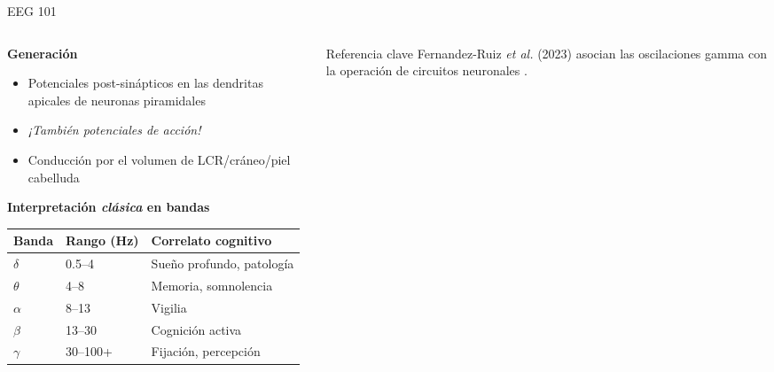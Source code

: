 \begin{frame}{EEG 101}
  \begin{columns}[T]
    \begin{column}{0.50\textwidth}
      \textbf{Generación}
      \begin{itemize}
        \item Potenciales post-sinápticos en las dendritas apicales de neuronas piramidales
        \item \emph{¡También potenciales de acción!}
        \item Conducción por el volumen de LCR/cráneo/piel cabelluda
      \end{itemize}
      \vspace{0.8em}
      \textbf{Interpretación \emph{clásica} en bandas}
        \small
        \begin{tabular}{lll}
          \toprule
          Banda & Rango (Hz) & Correlato cognitivo \\
          \midrule
          $\delta$ & 0.5--4   & Sueño profundo, patología \\
          $\theta$ & 4--8     & Memoria, somnolencia \\
          $\alpha$ & 8--13    & Vigilia \\
          $\beta$  & 13--30   & Cognición activa \\
          $\gamma$ & 30--100+ & Fijación, percepción \\
          \bottomrule
        \end{tabular}
    \end{column}
    \begin{column}{0.5\textwidth}
    	\begin{block}{Referencia clave}
    		\small
    		Fernandez-Ruiz \textit{et al.} (2023) asocian las oscilaciones gamma con la operación de circuitos neuronales \cite{Fernandez-Ruiz2023}.
    	\end{block}
    \end{column}
  \end{columns}
\end{frame}
